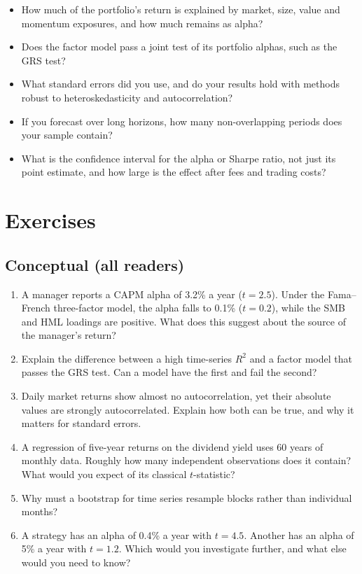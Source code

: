 \begin{itemize}
  \item How much of the portfolio's return is explained by market, size, value and momentum exposures, and how much remains as alpha?
  \item Does the factor model pass a joint test of its portfolio alphas, such as the GRS test?
  \item What standard errors did you use, and do your results hold with methods robust to heteroskedasticity and autocorrelation?
  \item If you forecast over long horizons, how many non-overlapping periods does your sample contain?
  \item What is the confidence interval for the alpha or Sharpe ratio, not just its point estimate, and how large is the effect after fees and trading costs?
\end{itemize}

\section*{Exercises}

\subsection*{Conceptual (all readers)}

\begin{enumerate}
  \item A manager reports a CAPM alpha of 3.2\% a year ($t=2.5$). Under the Fama--French three-factor model, the alpha falls to 0.1\% ($t=0.2$), while the SMB and HML loadings are positive. What does this suggest about the source of the manager's return?
  \item Explain the difference between a high time-series $R^2$ and a factor model that passes the GRS test. Can a model have the first and fail the second?
  \item Daily market returns show almost no autocorrelation, yet their absolute values are strongly autocorrelated. Explain how both can be true, and why it matters for standard errors.
  \item A regression of five-year returns on the dividend yield uses 60 years of monthly data. Roughly how many independent observations does it contain? What would you expect of its classical $t$-statistic?
  \item Why must a bootstrap for time series resample blocks rather than individual months?
  \item A strategy has an alpha of 0.4\% a year with $t=4.5$. Another has an alpha of 5\% a year with $t=1.2$. Which would you investigate further, and what else would you need to know?
\end{enumerate}

